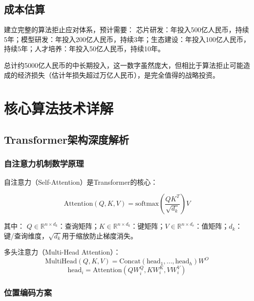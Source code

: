 \section{成本估算}

建立完整的算法拒止应对体系，预计需要：
芯片研发：年投入500亿人民币，持续5年；模型研发：年投入200亿人民币，持续3年；生态建设：年投入100亿人民币，持续5年；人才培养：年投入50亿人民币，持续10年。

总计约5000亿人民币的中长期投入，这一数字虽然庞大，但相比于算法拒止可能造成的经济损失（估计年损失超过万亿人民币），是完全值得的战略投资。

\chapter{核心算法技术详解}
\label{app:algorithms}

\section{Transformer架构深度解析}

\subsection{自注意力机制数学原理}

自注意力（Self-Attention）是Transformer的核心\cite{vaswani2017attention}：

\begin{equation}
\text{Attention}(Q, K, V) = \text{softmax}\left(\frac{QK^T}{\sqrt{d_k}}\right)V
\end{equation}

其中：
$Q \in \mathbb{R}^{n \times d_k}$：查询矩阵；$K \in \mathbb{R}^{n \times d_k}$：键矩阵；$V \in \mathbb{R}^{n \times d_v}$：值矩阵；$d_k$：键/查询维度，$\sqrt{d_k}$用于缩放防止梯度消失。

多头注意力（Multi-Head Attention）：
\begin{equation}
\text{MultiHead}(Q, K, V) = \text{Concat}(\text{head}_1, ..., \text{head}_h)W^O
\end{equation}
\begin{equation}
\text{head}_i = \text{Attention}(QW_i^Q, KW_i^K, VW_i^V)
\end{equation}

\subsection{位置编码方案}

